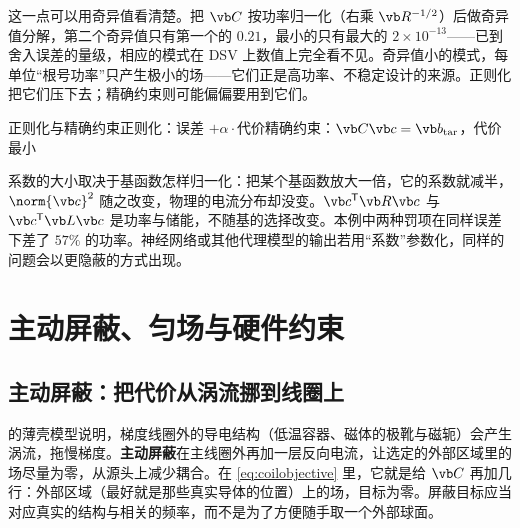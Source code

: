 这一点可以用奇异值看清楚。把 $\vb C$ 按功率归一化（右乘 $\vb R^{-1/2}$）后做奇异值分解，第二个奇异值只有第一个的 $0.21$，最小的只有最大的 $2\times10^{-13}$——已到舍入误差的量级，相应的模式在 DSV 上数值上完全看不见。奇异值小的模式，每单位“根号功率”只产生极小的场——它们正是高功率、不稳定设计的来源。正则化把它们压下去；精确约束则可能偏偏要用到它们。

\begin{compare}{正则化与精确约束}{正则化：误差 $+\alpha\cdot$代价}{精确约束：$\vb C\vb c=\vb b_{\rm tar}$，代价最小}
\end{compare}

\begin{pitfall}
系数的大小取决于基函数怎样归一化：把某个基函数放大一倍，它的系数就减半，$\norm{\vb c}^2$ 随之改变，物理的电流分布却没变。$\vb c^{\mathsf T}\vb R\vb c$ 与 $\vb c^{\mathsf T}\vb L\vb c$ 是功率与储能，不随基的选择改变。本例中两种罚项在同样误差下差了 $57\%$ 的功率。神经网络或其他代理模型的输出若用“系数”参数化，同样的问题会以更隐蔽的方式出现。
\end{pitfall}

\section{主动屏蔽、匀场与硬件约束}\label{sec:coils-hardware}

\subsection{主动屏蔽：把代价从涡流挪到线圈上}
 的薄壳模型说明，梯度线圈外的导电结构（低温容器、磁体的极靴与磁轭）会产生涡流，拖慢梯度。\textbf{主动屏蔽}在主线圈外再加一层反向电流，让选定的外部区域里的场尽量为零，从源头上减少耦合。在 \eqref{eq:coilobjective} 里，它就是给 $\vb C$ 再加几行：外部区域（最好就是那些真实导体的位置）上的场，目标为零。屏蔽目标应当对应真实的结构与相关的频率，而不是为了方便随手取一个外部球面。

